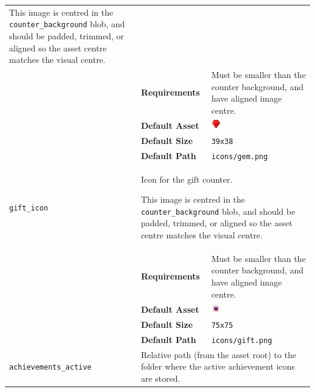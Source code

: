 \documentclass[a4paper, 10pt]{report}
\begin{document}
\begin{longtable}{| p{} p{} p{}|}
{    This image is centred in the \texttt{counter\_background} blob, and should be padded, trimmed, or aligned so the asset centre matches the visual centre.
  }\\
  & \textbf{Requirements} & Must be smaller than the counter background, and have aligned image centre.\\
  & \textbf{Default Asset} & \centering\arraybackslash\includegraphics[width=0.1\textwidth, valign=m]{../base/assets/icons/gem.png}\\
  & \textbf{Default Size} & \texttt{39x38}\\
  & \textbf{Default Path} & \texttt{icons/gem.png}\\[2ex]
  \hypertarget{profile-gift-icon}{\texttt{gift\_icon}} & \multicolumn{2}{p{.70\textwidth+2\tabcolsep}|}{
    Icon for the gift counter.

    This image is centred in the \texttt{counter\_background} blob, and should be padded, trimmed, or aligned so the asset centre matches the visual centre.
  }\\
  & \textbf{Requirements} & Must be smaller than the counter background, and have aligned image centre.\\
  & \textbf{Default Asset} & \centering\arraybackslash\includegraphics[width=0.1\textwidth, valign=m]{../base/assets/icons/gift.png}\\
  & \textbf{Default Size} & \texttt{75x75}\\
  & \textbf{Default Path} & \texttt{icons/gift.png}\\[2ex]
  \hypertarget{profile-achievements-active}{\texttt{achievements\_active}} & \multicolumn{2}{p{.70\textwidth+2\tabcolsep}|}{
    Relative path (from the asset root) to the folder where the active achievement icons are stored.

}
\end{longtable}
\end{document}
